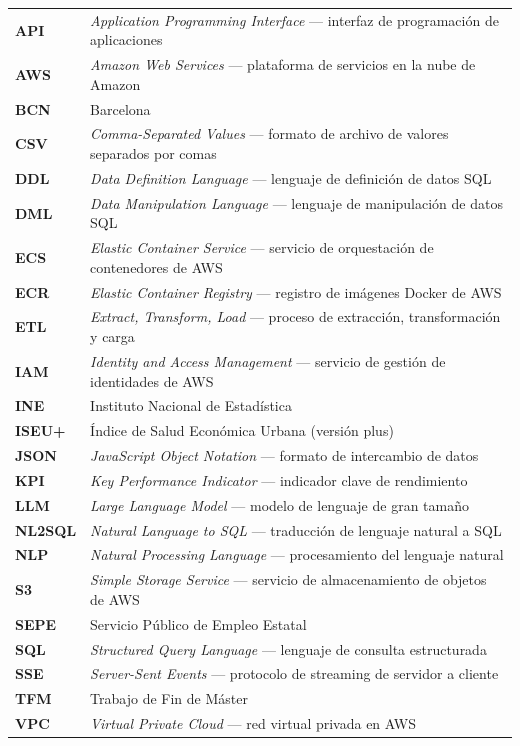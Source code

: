 \begin{longtable}{>{\bfseries}p{} p{}}
API    & \textit{Application Programming Interface} — interfaz de programación de aplicaciones \\
AWS    & \textit{Amazon Web Services} — plataforma de servicios en la nube de Amazon \\
BCN    & Barcelona \\
CSV    & \textit{Comma-Separated Values} — formato de archivo de valores separados por comas \\
DDL    & \textit{Data Definition Language} — lenguaje de definición de datos SQL \\
DML    & \textit{Data Manipulation Language} — lenguaje de manipulación de datos SQL \\
ECS    & \textit{Elastic Container Service} — servicio de orquestación de contenedores de AWS \\
ECR    & \textit{Elastic Container Registry} — registro de imágenes Docker de AWS \\
ETL    & \textit{Extract, Transform, Load} — proceso de extracción, transformación y carga \\
IAM    & \textit{Identity and Access Management} — servicio de gestión de identidades de AWS \\
INE    & Instituto Nacional de Estadística \\
ISEU+  & Índice de Salud Económica Urbana (versión plus) \\
JSON   & \textit{JavaScript Object Notation} — formato de intercambio de datos \\
KPI    & \textit{Key Performance Indicator} — indicador clave de rendimiento \\
LLM    & \textit{Large Language Model} — modelo de lenguaje de gran tamaño \\
NL2SQL & \textit{Natural Language to SQL} — traducción de lenguaje natural a SQL \\
NLP    & \textit{Natural Processing Language} — procesamiento del lenguaje natural \\
S3     & \textit{Simple Storage Service} — servicio de almacenamiento de objetos de AWS \\
SEPE   & Servicio Público de Empleo Estatal \\
SQL    & \textit{Structured Query Language} — lenguaje de consulta estructurada \\
SSE    & \textit{Server-Sent Events} — protocolo de streaming de servidor a cliente \\
TFM    & Trabajo de Fin de Máster \\
VPC    & \textit{Virtual Private Cloud} — red virtual privada en AWS \\
\end{longtable}
